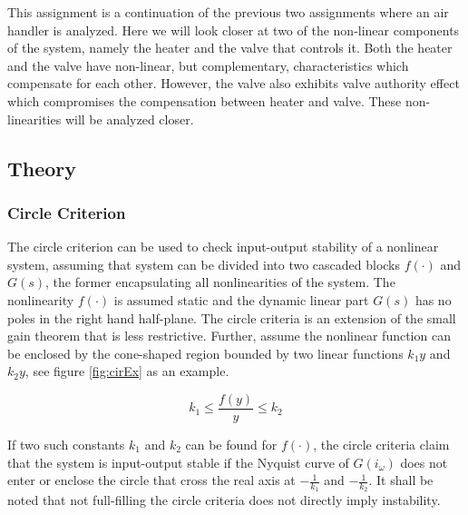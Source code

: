\documentclass[a4paper, titlepage]{article}
\begin{document}
This assignment is a continuation of the previous two assignments where an air handler is analyzed.
Here we will look closer at two of the non-linear components of the system, namely the heater and the valve that controls it.
Both the heater and the valve have non-linear, but complementary, characteristics which compensate for each other.  However, the valve also exhibits valve authority effect which compromises the compensation between heater and valve.  These non-linearities will be analyzed closer. 
\citep[p.123]{glad00}

\subsection{Theory}

\subsubsection{Circle Criterion}
The circle criterion can be used to check input-output stability of a nonlinear system, assuming that system can be divided into two cascaded blocks $f(\cdot)$ and $G(s)$, the former encapsulating all nonlinearities of the system.
The nonlinearity $f(\cdot)$ is assumed static and the dynamic linear part $G(s)$ has no poles in the right hand half-plane.
The circle criteria is an extension of the small gain theorem that is less restrictive.
Further, assume the nonlinear function can be enclosed by the cone-shaped region bounded by two linear functions $k_1y$ and $k_2y$, see figure \ref{fig:cirEx} as an example.

\begin{equation}
k_1 \leq \frac{f(y)}{y} \leq k_2 
\end{equation} 

If two such constants $k_1$ and $k_2$ can be found for $f(\cdot)$, the circle criteria claim that the system is input-output stable if the Nyquist curve of $G(i_\omega)$ does not enter or enclose the circle that cross the real axis at $-\frac{1}{k_1}$ and $-\frac{1}{k_2}$.
It shall be noted that not full-filling the circle criteria does not directly imply instability. \citep[~p.329-334]{glad00}
\end{document}
